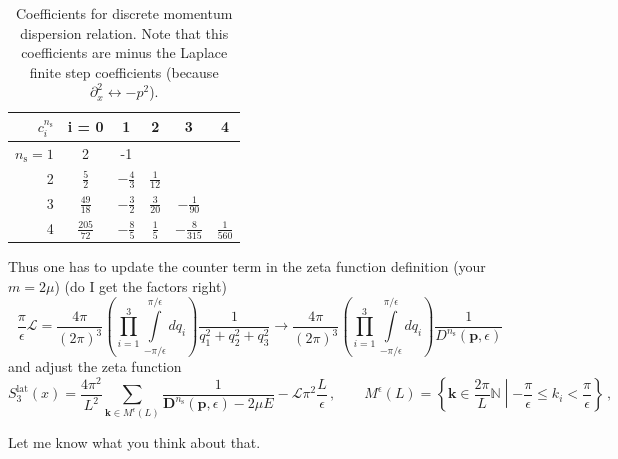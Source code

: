 \documentclass[
    aps,
    prl,
    showkeys,
    nofootinbib,
    floatfix
]{revtex4-1}
\renewcommand{\vec}[1]{\boldsymbol{#1}}
\begin{document}
\begin{table}[htb]
\centering
\begin{tabular}{r | ccccc}
$ c_{i}^{n_{\mathrm{s}}}$ & i = 0 & 1 & 2 & 3 & 4 \\ \hline
$n_{\mathrm{s}} = 1$ & 2 & -1 \\
2 & $\frac{5}{2}$ & $-\frac{4}{3}$ & $\frac{1}{12}$ \\
3 & $\frac{49}{18}$ & $-\frac{3}{2}$ & $\frac{3}{20}$ & $-\frac{1}{90}$ \\
4 & $\frac{205}{72}$ & $-\frac{8}{5}$ & $\frac{1}{5}$  & $-\frac{8}{315}$ & $\frac{1}{560}$
\end{tabular}
\caption{\label{tab-dispersion-coeff}Coefficients for discrete momentum dispersion relation.
    Note that this coefficients are minus the Laplace finite step coefficients (because $\partial_x^2 \leftrightarrow - p^2$).
}
\end{table}

Thus one has to update the counter term in the zeta function definition (your $m = 2\mu$) (do I get the factors right)
\begin{equation}
    \frac{\pi}{\epsilon}
    \mathcal L
    =
    \frac{4 \pi}{(2\pi)^3}
    \left(
    \prod \limits_{i=1}^3
    \int\limits_{-\pi /\epsilon}^{\pi / \epsilon}
    d q_i
    \right)
    \frac{1}{q_1^2 + q_2^2 + q_3^2}
    \to
    \frac{4 \pi}{(2\pi)^3}
    \left(
    \prod \limits_{i=1}^3
    \int\limits_{-\pi / \epsilon}^{\pi / \epsilon}
    d q_i
    \right)
    \frac{1}{D^{n_{\mathrm{s}}}(\vec p, \epsilon)}
\end{equation}
and adjust the zeta function
\begin{equation}
    S_3^{\mathrm{lat}}(x) = \frac{4 \pi^2}{L^2} \sum\limits_{\vec k \in M^\epsilon(L)} \frac{1}{\vec D^{n_{\mathrm{s}}}(\vec p, \epsilon) - 2 \mu E} - \mathcal L \pi^2 \frac{L}{\epsilon}
    \, , \qquad
    M^\epsilon(L) = \left\{ \vec k \in \frac{2 \pi}{L} \mathbb N \middle\vert - \frac{\pi}{\epsilon} \leq k_i < \frac{\pi}{\epsilon} \right\}
    \, ,
\end{equation}

Let me know what you think about that.
\end{document}
